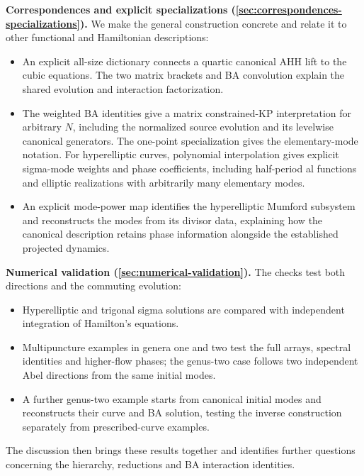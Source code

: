 \noindent\textbf{Correspondences and explicit specializations
(\cref{sec:correspondences-specializations}).}
We make the general construction concrete and relate it to other
functional and Hamiltonian descriptions:
\begin{itemize}
\item An explicit all-size dictionary connects a quartic canonical
AHH lift to the cubic equations. The two matrix brackets and BA
convolution explain the shared evolution and interaction factorization.
\item The weighted BA identities give a matrix constrained-KP
interpretation for arbitrary $N$, including the normalized source
evolution and its levelwise canonical generators. The one-point
specialization gives the elementary-mode notation. For hyperelliptic curves,
polynomial interpolation gives explicit sigma-mode weights and
phase coefficients, including half-period al functions and elliptic
realizations with arbitrarily many elementary modes.
\item An explicit mode-power map identifies the hyperelliptic Mumford
subsystem and reconstructs the modes from its divisor data, explaining
how the canonical description retains phase information alongside
the established projected dynamics.
\end{itemize}

\noindent\textbf{Numerical validation
(\cref{sec:numerical-validation}).}
The checks test both directions and the commuting evolution:
\begin{itemize}
\item Hyperelliptic and trigonal sigma solutions are compared with
independent integration of Hamilton's equations.
\item Multipuncture examples in genera one and two test the full
arrays, spectral identities and higher-flow phases; the genus-two
case follows two independent Abel directions from the same initial modes.
\item A further genus-two example starts from canonical initial modes
and reconstructs their curve and BA solution, testing the inverse
construction separately from prescribed-curve examples.
\end{itemize}
The discussion then brings these results together and identifies
further questions concerning the hierarchy, reductions and BA
interaction identities.
